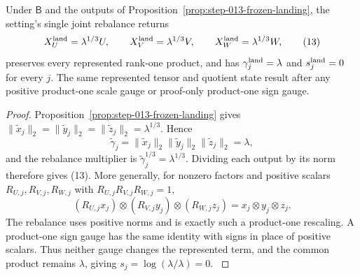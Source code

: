 \begin{proposition}\label{prop:step-013-rebalance-gauge}
Under \(\mathsf B\) and the
outputs of Proposition~\ref{prop:step-013-frozen-landing}, the setting's
single joint rebalance returns
\[
X_U^{\rm land}=\lambda^{1/3}U,\qquad
X_V^{\rm land}=\lambda^{1/3}V,\qquad
X_W^{\rm land}=\lambda^{1/3}W,
\tag{13}
\]
preserves every represented rank-one product, and has
\(\gamma_j^{\rm land}=\lambda\) and \(s_j^{\rm land}=0\) for every \(j\).
The same represented tensor and quotient state result after any positive
product-one scale gauge or proof-only product-one sign gauge.

\begin{proof}
Proposition~\ref{prop:step-013-frozen-landing}
gives \(\|\widetilde x_j\|_2=\|\widetilde y_j\|_2
=\|\widetilde z_j\|_2=\lambda^{1/3}\). Hence
\[
\widetilde\gamma_j
=\|\widetilde x_j\|_2\|\widetilde y_j\|_2\|\widetilde z_j\|_2
=\lambda,
\tag{14}
\]
and the rebalance multiplier is \(\widetilde\gamma_j^{1/3}
=\lambda^{1/3}\). Dividing each output by its norm therefore gives (13).
More generally, for nonzero factors and positive scalars
\(R_{U,j},R_{V,j},R_{W,j}\) with
\(R_{U,j}R_{V,j}R_{W,j}=1\),
\[
(R_{U,j}x_j)\otimes(R_{V,j}y_j)\otimes(R_{W,j}z_j)
=x_j\otimes y_j\otimes z_j.
\tag{15}
\]
The rebalance uses positive norms and is exactly such a product-one
rescaling. A product-one sign gauge has the same identity with signs in
place of positive scalars. Thus neither gauge changes the represented term,
and the common product remains \(\lambda\), giving
\(s_j=\log(\lambda/\lambda)=0\).
\(\)


\end{proof}
\end{proposition}
